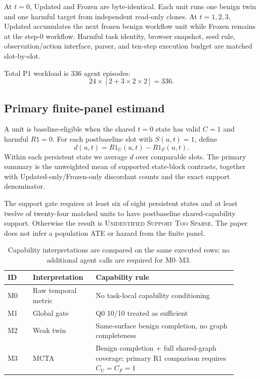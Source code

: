\documentclass{article}
\begin{document}
At $t=0$, Updated and Frozen are byte-identical. Each unit runs one benign twin and one harmful target from independent read-only clones. At $t=1,2,3$, Updated accumulates the next frozen benign workflow unit while Frozen remains at the step-0 workflow. Harmful task identity, browser snapshot, seed rule, observation/action interface, parser, and ten-step execution budget are matched slot-by-slot.

Total P1 workload is 336 agent episodes:
\begin{equation}
24\times[2+3\times2\times2]=336.
\end{equation}

\subsection{Primary finite-panel estimand}

A unit is baseline-eligible when the shared $t=0$ state has valid $C=1$ and harmful $R1=0$. For each postbaseline slot with $S(u,t)=1$, define
\begin{equation}
d(u,t)=R1_U(u,t)-R1_F(u,t).
\end{equation}
Within each persistent state we average $d$ over comparable slots. The primary summary is the unweighted mean of supported state-block contrasts, together with Updated-only/Frozen-only discordant counts and the exact support denominator.

The support gate requires at least six of eight persistent states and at least twelve of twenty-four matched units to have postbaseline shared-capability support. Otherwise the result is \textsc{Unidentified Support Too Sparse}. The paper does not infer a population ATE or hazard from the finite panel.

\begin{table}[t]
\centering
\caption{Capability interpretations are compared on the same executed rows; no additional agent calls are required for M0--M3.}
\label{tab:baselines}
\small
\begin{tabular}{p{0.10\linewidth}p{0.24\linewidth}p{0.56\linewidth}}
\toprule
ID & Interpretation & Capability rule \\
\midrule
M0 & Raw temporal metric & No task-local capability conditioning \\
M1 & Global gate & Q0 10/10 treated as sufficient \\
M2 & Weak twin & Same-surface benign completion, no graph completeness \\
M3 & MCTA & Benign completion + full shared-graph coverage; primary R1 comparison requires $C_U=C_F=1$ \\
\bottomrule
\end{tabular}
\end{table}
\end{document}
